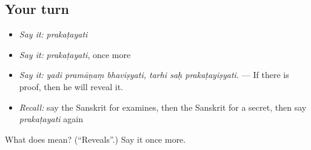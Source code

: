 \subsection*{Your turn}
\begin{itemize}
\raggedright
  \item \emph{Say it:} \emph{prakaṭayati}
  \item \emph{Say it:} \emph{prakaṭayati}, once more
  \item \emph{Say it:} \emph{yadi pramāṇaṃ bhaviṣyati, tarhi saḥ prakaṭayiṣyati.} — If there is proof, then he will reveal it.
  \item \emph{Recall:} say the Sanskrit for examines, then the Sanskrit for a secret, then say \emph{prakaṭayati} again
\end{itemize}

\begin{tcolorbox}[breakable,colback=teal!4,colframe=teal!35!black,title={Before you move on}]
What does  mean? (\textquotedblleft{}Reveals\textquotedblright{}.) Say it once more.
\end{tcolorbox}
